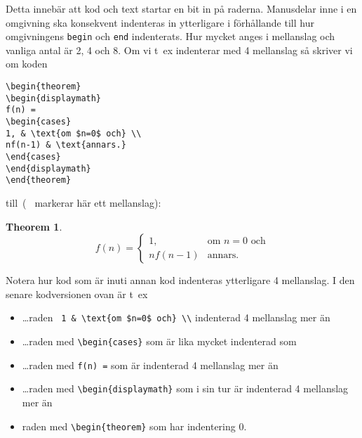 \documentclass[a4paper,12pt]{article}
\newtheorem{theorem}{Theorem}
\begin{document}
Detta innebär att kod och text startar en bit in på raderna.
Manusdelar inne i en omgivning ska konsekvent indenteras in
ytterligare i förhållande till hur omgivningens \texttt{begin} och
\texttt{end} indenterats. Hur mycket anges i mellanslag och vanliga
antal är 2, 4 och 8. Om vi t~ex indenterar med 4 mellanslag så skriver
vi om koden  
%
\begin{verbatim}
\begin{theorem}
\begin{displaymath}
f(n) = 
\begin{cases}
1, & \text{om $n=0$ och} \\
nf(n-1) & \text{annars.}
\end{cases}
\end{displaymath}
\end{theorem}
\end{verbatim}
%
till~(\verb*! ! markerar här ett mellanslag): 
%
\begin{verbatim*}
\begin{theorem}
    \begin{displaymath}
        f(n) = 
        \begin{cases}
            1, & \text{om $n=0$ och} \\
            nf(n-1) & \text{annars.}
        \end{cases}
    \end{displaymath}
\end{theorem}
\end{verbatim*}
%
Notera hur kod som är inuti annan kod indenteras ytterligare 4
mellanslag. I den senare kodversionen ovan är t~ex 
\begin{itemize}
  \item \dots raden \verb! 1 & \text{om $n=0$ och} \\! indenterad 4
    mellanslag mer än

  \item \dots raden med \verb!\begin{cases}! som är lika mycket indenterad som

  \item \dots raden med \verb!f(n) =! som är indenterad 4 mellanslag mer än

  \item \dots raden med \verb!\begin{displaymath}! som i sin tur är
    indenterad 4 mellanslag mer än

  \item raden med \verb!\begin{theorem}! som har indentering 0.
\end{itemize}
\end{document}
